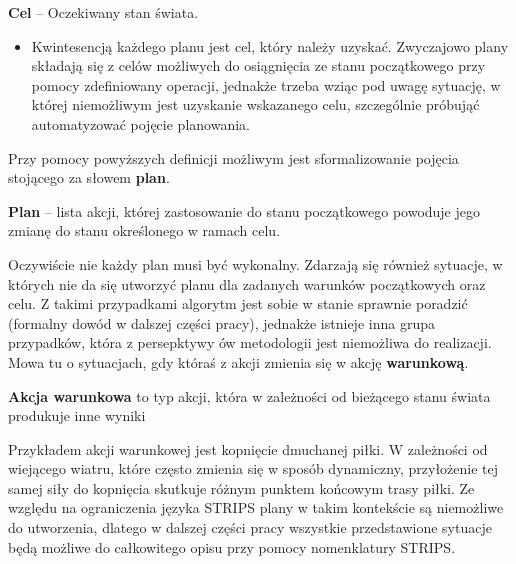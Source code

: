     \begin{definition}
    \label{Cel}
        \textbf{Cel} -- Oczekiwany stan świata.
    \end{definition}
    \begin{itemize}
        \item Kwintesencją każdego planu jest cel, który należy uzyskać. Zwyczajowo plany składają się z celów możliwych do
        osiągnięcia ze stanu początkowego przy pomocy zdefiniowany operacji, jednakże trzeba wziąc pod uwagę sytuację, w której 
        niemożliwym jest uzyskanie wskazanego celu, szczególnie próbująć automatyzować pojęcie planowania.
    \end{itemize} 
    Przy pomocy powyższych definicji możliwym jest sformalizowanie pojęcia stojącego za słowem \textbf{plan}. 
    \begin{definition}
    \label{Plan}
    \textbf{Plan} -- lista akcji, której zastosowanie do stanu początkowego powoduje jego zmianę do stanu określonego w ramach celu. 
    \end{definition}

    Oczywiście nie każdy plan musi być wykonalny. Zdarzają się również sytuacje, w których nie da się utworzyć planu dla zadanych warunków 
    początkowych oraz celu. Z takimi przypadkami algorytm jest sobie w stanie sprawnie poradzić (formalny dowód w dalszej części pracy), 
    jednakże istnieje inna grupa przypadków, która z persepktywy ów metodologii jest niemożliwa do realizacji. 
    Mowa tu o sytuacjach, gdy któraś z akcji zmienia się w akcję \textbf{warunkową}.
    \begin{definition}
        \label{Akcja warunkowa}
        \textbf{Akcja warunkowa} to typ akcji, która w zależności od bieżącego stanu świata produkuje inne wyniki
    \end{definition}

    Przykładem akcji warunkowej jest kopnięcie dmuchanej piłki. W zależności od wiejącego wiatru, które często zmienia się w sposób dynamiczny, 
    przyłożenie tej samej siły do kopnięcia skutkuje różnym punktem końcowym trasy piłki. Ze względu na ograniczenia języka STRIPS plany w 
    takim kontekście są niemożliwe do utworzenia, dlatego w dalszej części pracy wszystkie przedstawione sytuacje będą możliwe do całkowitego 
    opisu przy pomocy nomenklatury STRIPS.
    
